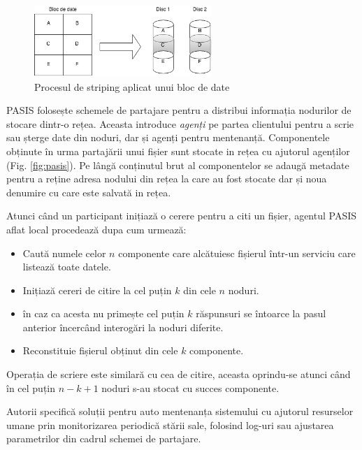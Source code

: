 \documentclass[oneside, 12pt]{book}
\begin{document}
\begin{figure}
	\begin{center}
	\includegraphics[width=0.6\textwidth]{img/raid0.png}
	\caption{Procesul de striping aplicat unui bloc de date}
	\label{fig:raid_strip}
	\end{center}
	\bigskip
\end{figure}

PASIS folosește schemele de partajare pentru a distribui informația nodurilor de stocare dintr-o rețea. Aceasta introduce \textit{agenți} pe partea clientului pentru a scrie sau șterge date din noduri, dar și agenți pentru mentenanță. Componentele obținute în urma partajării unui fișier sunt stocate in rețea cu ajutorul agenților (Fig. \ref{fig:pasis}). Pe lângă conținutul brut al componentelor se adaugă metadate pentru a reține adresa nodului din rețea la care au fost stocate dar și noua denumire cu care este salvată in rețea.

Atunci când un participant inițiază o cerere pentru a citi un fișier, agentul PASIS aflat local procedează dupa cum urmează:
\begin{itemize}
	\item Caută numele celor $n$ componente care alcătuiesc fișierul într-un serviciu care listează toate datele.
	\item Inițiază cereri de citire la cel puțin $k$ din cele $n$ noduri.
	\item în caz ca acesta nu primește cel puțin $k$ răspunsuri se întoarce la pasul anterior încercând interogări la noduri diferite.
	\item Reconstituie fișierul obținut din cele $k$ componente.
\end{itemize}
Operația de scriere este similară cu cea de citire, aceasta oprindu-se atunci când în cel puțin $n - k + 1$ noduri s-au stocat cu succes componente.

Autorii specifică soluții pentru auto mentenanța sistemului cu ajutorul resurselor umane prin monitorizarea periodică stării sale, folosind log-uri sau ajustarea parametrilor din cadrul schemei de partajare.
\end{document}
